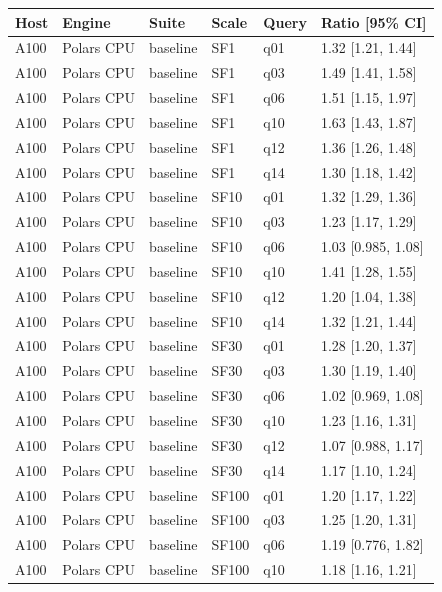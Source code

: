 \begin{longtable}{llllll}
\toprule
Host & Engine & Suite & Scale & Query & Ratio [95\% CI] \\
\midrule
\endhead
\bottomrule
\endfoot
A100 & Polars CPU & baseline & SF1 & q01 & 1.32 [1.21, 1.44] \\
A100 & Polars CPU & baseline & SF1 & q03 & 1.49 [1.41, 1.58] \\
A100 & Polars CPU & baseline & SF1 & q06 & 1.51 [1.15, 1.97] \\
A100 & Polars CPU & baseline & SF1 & q10 & 1.63 [1.43, 1.87] \\
A100 & Polars CPU & baseline & SF1 & q12 & 1.36 [1.26, 1.48] \\
A100 & Polars CPU & baseline & SF1 & q14 & 1.30 [1.18, 1.42] \\
A100 & Polars CPU & baseline & SF10 & q01 & 1.32 [1.29, 1.36] \\
A100 & Polars CPU & baseline & SF10 & q03 & 1.23 [1.17, 1.29] \\
A100 & Polars CPU & baseline & SF10 & q06 & 1.03 [0.985, 1.08] \\
A100 & Polars CPU & baseline & SF10 & q10 & 1.41 [1.28, 1.55] \\
A100 & Polars CPU & baseline & SF10 & q12 & 1.20 [1.04, 1.38] \\
A100 & Polars CPU & baseline & SF10 & q14 & 1.32 [1.21, 1.44] \\
A100 & Polars CPU & baseline & SF30 & q01 & 1.28 [1.20, 1.37] \\
A100 & Polars CPU & baseline & SF30 & q03 & 1.30 [1.19, 1.40] \\
A100 & Polars CPU & baseline & SF30 & q06 & 1.02 [0.969, 1.08] \\
A100 & Polars CPU & baseline & SF30 & q10 & 1.23 [1.16, 1.31] \\
A100 & Polars CPU & baseline & SF30 & q12 & 1.07 [0.988, 1.17] \\
A100 & Polars CPU & baseline & SF30 & q14 & 1.17 [1.10, 1.24] \\
A100 & Polars CPU & baseline & SF100 & q01 & 1.20 [1.17, 1.22] \\
A100 & Polars CPU & baseline & SF100 & q03 & 1.25 [1.20, 1.31] \\
A100 & Polars CPU & baseline & SF100 & q06 & 1.19 [0.776, 1.82] \\
A100 & Polars CPU & baseline & SF100 & q10 & 1.18 [1.16, 1.21] \\

\end{longtable}

